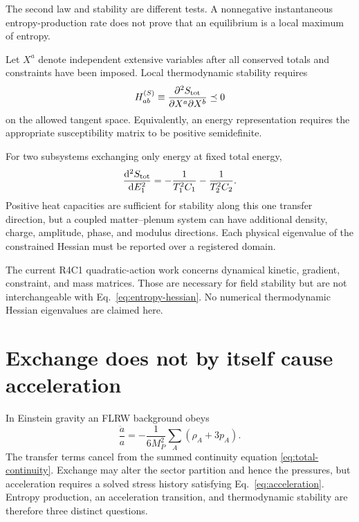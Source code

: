 \documentclass[aps,prd,reprint,superscriptaddress,nofootinbib,floatfix]{revtex4-2}
\newcommand{\dd}{\mathrm{d}}
\begin{document}
The second law and stability are different tests.  A nonnegative instantaneous
entropy-production rate does not prove that an equilibrium is a local maximum
of entropy.

Let \(X^a\) denote independent extensive variables after all conserved totals
and constraints have been imposed.  Local thermodynamic stability requires
\begin{equation}
 H^{(S)}_{ab}
 \equiv
 \frac{\partial^2S_{\rm tot}}{\partial X^a\partial X^b}
 \preceq0
 \label{eq:entropy-hessian}
\end{equation}
on the allowed tangent space.  Equivalently, an energy representation requires
the appropriate susceptibility matrix to be positive semidefinite.

For two subsystems exchanging only energy at fixed total energy,
\begin{equation}
 \frac{\dd^2 S_{\rm tot}}{\dd E_1^2}
 =-\frac{1}{T_1^2C_1}
  -\frac{1}{T_2^2C_2}.
 \label{eq:heat-capacity}
\end{equation}
Positive heat capacities are sufficient for stability along this one transfer
direction, but a coupled matter--plenum system can have additional density,
charge, amplitude, phase, and modulus directions.  Each physical eigenvalue of
the constrained Hessian must be reported over a registered domain.

The current R4C1 quadratic-action work concerns dynamical kinetic, gradient,
constraint, and mass matrices.  Those are necessary for field stability but
are not interchangeable with Eq.~\eqref{eq:entropy-hessian}.  No numerical
thermodynamic Hessian eigenvalues are claimed here.

\section{Exchange does not by itself cause acceleration}
\label{sec:acceleration}

In Einstein gravity an FLRW background obeys
\begin{equation}
 \frac{\ddot a}{a}
 =-\frac{1}{6M_P^2}
 \sum_A(\rho_A+3p_A).
 \label{eq:acceleration}
\end{equation}
The transfer terms cancel from the summed continuity equation
\eqref{eq:total-continuity}.  Exchange may alter the sector partition and hence
the pressures, but acceleration requires a solved stress history satisfying
Eq.~\eqref{eq:acceleration}.  Entropy production, an acceleration transition,
and thermodynamic stability are therefore three distinct questions.
\end{document}
